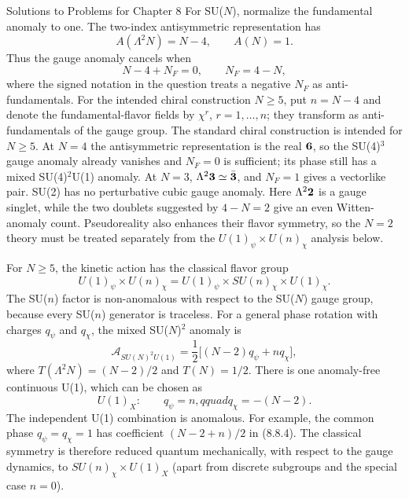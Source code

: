 \begin{bankssolutions}{Solutions to Problems for Chapter 8}
For SU($N$), normalize the fundamental anomaly to one.  The two-index
antisymmetric representation has
\[
  A(\Lambda^2N)=N-4,
  \qquad A(N)=1 .
  \tag{8.8.1}
\]
Thus the gauge anomaly cancels when
\[
  N-4+N_F=0,
  \qquad N_F=4-N,
  \tag{8.8.2}
\]
where the signed notation in the question treats a negative $N_F$ as
anti-fundamentals.  For the intended chiral construction $N\geq5$, put
$n=N-4$ and denote the
fundamental-flavor fields by $\chi^r$, $r=1,\ldots,n$; they transform as
anti-fundamentals of the gauge group.
The standard chiral construction is intended for $N\geq5$.  At $N=4$ the
antisymmetric representation is the real ${\bf6}$, so the SU(4)$^3$ gauge
anomaly already vanishes and $N_F=0$ is sufficient; its phase still has a
mixed SU(4)$^2$U(1) anomaly.  At $N=3$, $\Lambda^2{\bf3}\simeq\bar{\bf3}$,
and $N_F=1$ gives a vectorlike pair.  SU(2) has no perturbative cubic gauge
anomaly. Here $\Lambda^2{\bf2}$ is a gauge singlet, while the two doublets
suggested by $4-N=2$ give an even Witten-anomaly count. Pseudoreality also
enhances their flavor symmetry, so the $N=2$ theory must be treated separately
from the $U(1)_\psi\times U(n)_\chi$ analysis below.

For $N\geq5$, the kinetic action has the classical flavor group
\[
  U(1)_\psi\times U(n)_\chi
  =U(1)_\psi\times SU(n)_\chi\times U(1)_\chi .
  \tag{8.8.3}
\]
The SU($n$) factor is non-anomalous with respect to the SU($N$) gauge group,
because every SU($n$) generator is traceless.  For a general phase rotation
with charges $q_\psi$ and $q_\chi$, the mixed SU($N$)$^2$ anomaly is
\[
  \mathcal A_{SU(N)^2U(1)}
  =\frac12\bigl[(N-2)q_\psi+nq_\chi\bigr],
  \tag{8.8.4}
\]
where $T(\Lambda^2N)=(N-2)/2$ and $T(N)=1/2$.  There is one anomaly-free
continuous U(1), which can be chosen as
\[
  U(1)_X:\qquad q_\psi=n,qquad q_\chi=-(N-2).
  \tag{8.8.5}
\]
The independent U(1) combination is anomalous.  For example, the common
phase $q_\psi=q_\chi=1$ has coefficient $(N-2+n)/2$ in (8.8.4).  The
classical symmetry is therefore reduced quantum mechanically, with respect
to the gauge dynamics, to $SU(n)_\chi\times U(1)_X$ (apart from discrete
subgroups and the special case $n=0$).


\end{bankssolutions}
